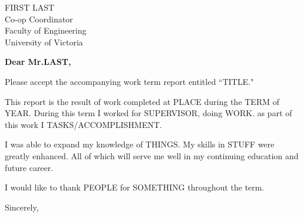 \documentclass[12pt]{letter}
\begin{document}

\begin{letter}{FIRST LAST \\ Co-op Coordinator \\ Faculty of Engineering \\  University of Victoria} %


\opening{\textbf{Dear Mr.\@ LAST,}}
 
Please accept the accompanying work term report entitled ``TITLE."

This report is the result of work completed at PLACE during the TERM of YEAR. During this term I worked for SUPERVISOR, doing WORK. as part of this work I TASKS/ACCOMPLISHMENT.

I was able to expand my knowledge of THINGS. My skills in STUFF were greatly enhanced. All of which will serve me well in my continuing education and future career.

I would like to thank PEOPLE for SOMETHING throughout the term. 


\vspace{2\parskip} %
\closing{Sincerely,}
\vspace{2\parskip} %




\end{letter}
 
\end{document}
